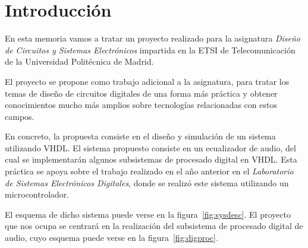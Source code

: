 \documentclass[a4paper,12pt]{article}
\begin{document}
\newcommand\litem[1]{\item{\bfseries #1 }}
\renewcommand{\arraystretch}{1.5} %

\newcommand\headcell[1]{%
  \multicolumn{1}{c|}{\cellcolor{MidnightBlue}\bfseries\sffamily\textcolor{white}{#1}}
}
\newcommand\headcelld[1]{%
  \multicolumn{1}{c||}{\cellcolor{MidnightBlue}\bfseries\sffamily\textcolor{white}{#1}}
}

%




\newpage
{}
\tableofcontents %

\clearpage
\setcounter{page}{1}
\section{Introducción}
En esta memoria vamos a tratar un proyecto realizado para la asignatura \emph{Diseño de Circuitos y Sistemas Electrónicos} impartida en la ETSI de Telecomunicación de la Universidad Politécnica de Madrid.

El proyecto se propone como trabajo adicional a la asignatura, para tratar los temas de diseño de circuitos digitales de una forma más práctica y obtener conocimientos mucho más amplios sobre tecnologías relacionadas con estos campos.

En concreto, la propuesta consiste en el diseño y simulación de un sistema utilizando VHDL. El sistema propuesto consiste en un ecualizador de audio, del cual se implementarán algunos subsistemas de procesado digital en VHDL. Esta práctica se apoya sobre el trabajo realizado en el año anterior en el \emph{Laboratorio de Sistemas Electrónicos Digitales}, donde se realizó este sistema utilizando un microcontrolador.

El esquema de dicho sistema puede verse en la figura~\ref{fig:sysdesc}. El proyecto que nos ocupa se centrará en la realización del subsistema de procesado digital de audio, cuyo esquema puede verse en la figura~\ref{fig:digproc}.
\end{document}
